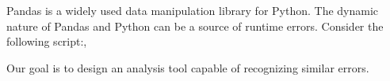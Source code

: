 \Large
Pandas is a widely used data manipulation library for Python.
The dynamic nature of Pandas and Python can be a source of runtime errors.
Consider the following script:,



Our goal is to design an analysis tool capable of recognizing similar errors.